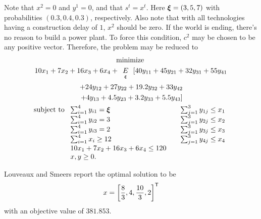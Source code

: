 Note that $x^2 = 0$ and $y^1=0$, and that $s^t=x^t$.  Here $\mathbf{\boldsymbol{\xi}}=(3,5,7)$ with probabilities $(0.3, 0.4, 0.3)$, respectively.  Also note that with all technologies having a construction delay of $1$, $x^2$ should be zero.  If the world is ending, there's no reason to build a power plant.  To force this condition, $c^2$ may be chosen to be any positive vector.  Therefore, the problem may be reduced to
{\allowdisplaybreaks
\begin{multline*}
\hbox{minimize }\\
10 x_1+7x_2+16x_3+6x_4+ \expect[\xi]\left[ 40y_{11}+45y_{21}+32y_{31}+55y_{41}\right.\\
+24y_{12}+27y_{22}+19.2y_{32}+33y_{42}\\
\left.+4y_{13}+4.5y_{23}+3.2y_{33}+5.5y_{43}\right]\\
\mbox{subject to }
\begin{array}[t]{lll}
\sum_{i=1}^4 y_{i1} =\rand{\xi} & & \sum_{j=1}^3 y_{1j} \leq x_1 \\
\sum_{i=1}^4 y_{i2} =3 & & \sum_{j=1}^3 y_{2j} \leq x_2\\
\sum_{i=1}^4 y_{i3} =2 & & \sum_{j=1}^3 y_{3j} \leq x_3\\
\sum_{i=1}^4 x_i \geq 12 & &\sum_{j=1}^3 y_{4j} \leq x_4 \\
10x_1+7x_2+16x_3+6x_4 \leq 120 &&\\
x, y \geq 0.&&
\end{array}
\end{multline*}
}

Louveaux and Smeers \cite{smeers88} report the optimal solution to be 
\[
x=\left[ \frac{8}{3}, 4, \frac{10}{3}, 2\right]^{\mbox{\scriptsize\sf T}}
\]
with an objective value of $381.853$.

